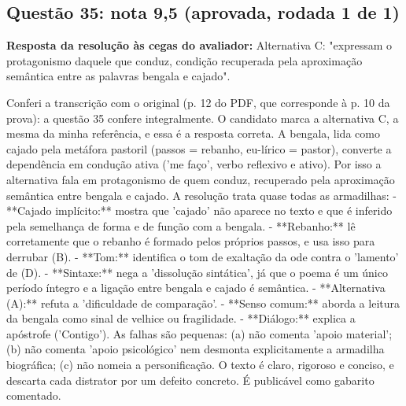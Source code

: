 \documentclass{article}%
\begin{document}
\subsection*{Questão 35: nota 9,5 (aprovada, rodada 1 de 1)}%
\textbf{Resposta da resolução às cegas do avaliador:} Alternativa C: "expressam o protagonismo daquele que conduz, condição recuperada pela aproximação semântica entre as palavras bengala e cajado".\par %
Conferi a transcrição com o original (p. 12 do PDF, que corresponde à p. 10 da prova): a questão 35 confere integralmente. O candidato marca a alternativa C, a mesma da minha referência, e essa é a resposta correta. A bengala, lida como cajado pela metáfora pastoril (passos = rebanho, eu{-}lírico = pastor), converte a dependência em condução ativa ('me faço', verbo reflexivo e ativo). Por isso a alternativa fala em protagonismo de quem conduz, recuperado pela aproximação semântica entre bengala e cajado.\newline%
\newline%
A resolução trata quase todas as armadilhas:\newline%
{-} **Cajado implícito:** mostra que 'cajado' não aparece no texto e que é inferido pela semelhança de forma e de função com a bengala.\newline%
{-} **Rebanho:** lê corretamente que o rebanho é formado pelos próprios passos, e usa isso para derrubar (B).\newline%
{-} **Tom:** identifica o tom de exaltação da ode contra o 'lamento' de (D).\newline%
{-} **Sintaxe:** nega a 'dissolução sintática', já que o poema é um único período íntegro e a ligação entre bengala e cajado é semântica.\newline%
{-} **Alternativa (A):** refuta a 'dificuldade de comparação'.\newline%
{-} **Senso comum:** aborda a leitura da bengala como sinal de velhice ou fragilidade.\newline%
{-} **Diálogo:** explica a apóstrofe ('Contigo').\newline%
\newline%
As falhas são pequenas: (a) não comenta 'apoio material'; (b) não comenta 'apoio psicológico' nem desmonta explicitamente a armadilha biográfica; (c) não nomeia a personificação. O texto é claro, rigoroso e conciso, e descarta cada distrator por um defeito concreto. É publicável como gabarito comentado.%
\end{document}
